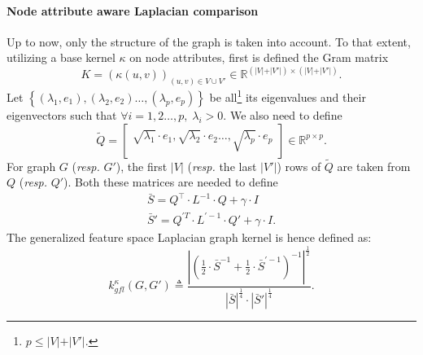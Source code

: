             \paragraph{Node attribute aware Laplacian comparison}
                Up to now, only the structure of the graph is taken into account.
                To that extent, utilizing a base kernel $\kappa$ on node attributes, first is defined the Gram matrix
                \begin{equation*}
                    K=\left(\kappa\left(u, v\right)\right)_{(u,v) \in V \cup V'} \in \mathbb{R}^{\left(\vert V \vert + \vert V' \vert\right) \times \left(\vert V \vert + \vert V' \vert\right)}.
                \end{equation*}
                Let $\left\{ (\lambda_1, e_1), (\lambda_2, e_2)\dots,(\lambda_p, e_p) \right\}$ be all\footnote{$p \leq \vert V \vert + \vert V' \vert$.} its eigenvalues and their eigenvectors such that $\forall i = 1, 2 \dots, p,\; \lambda_i > 0$.
                We also need to define
                \begin{equation*}
                    \widetilde{Q} = \begin{bmatrix}
                        \sqrt{\lambda_1}\cdot e_1, \sqrt{\lambda_2}\cdot e_2 \dots, \sqrt{\lambda_p}\cdot e_p
                    \end{bmatrix} \in \mathbb{R}^{p \times p}.
                \end{equation*}
                For graph \(G\) (\textit{resp.} \(G'\)), the first $\vert V \vert$ (\textit{resp.} the last $\vert V' \vert$) rows of $\widetilde{Q}$ are taken from $Q$ (\textit{resp.} $Q'$).
                Both these matrices are needed to define 
                \begin{align*}
                    \bar{S} = Q^\intercal\cdot L ^{-1}\cdot Q + \gamma \cdot I\\
                    \bar{S}' = Q^{\prime T}\cdot L^{\prime -1}\cdot Q' + \gamma \cdot I.
                \end{align*}
                The generalized feature space Laplacian graph kernel is hence defined as:
                \begin{equation}
                    \label{eq::generalized_feature_laplacian_kernel}
                    k^{\kappa}_{gfl}(G, G') \triangleq \frac{\left\lvert \left(\frac{1}{2} \cdot \bar{S}^{-1} + \frac{1}{2} \cdot \bar{S}^{\prime -1} \right)^{-1} \right\rvert^{\frac{1}{2}}}{\left\lvert \bar{S}\right\rvert^{\frac{1}{4}}\cdot\left\lvert \bar{S}' \right\rvert^{\frac{1}{4}}}.
                \end{equation}

